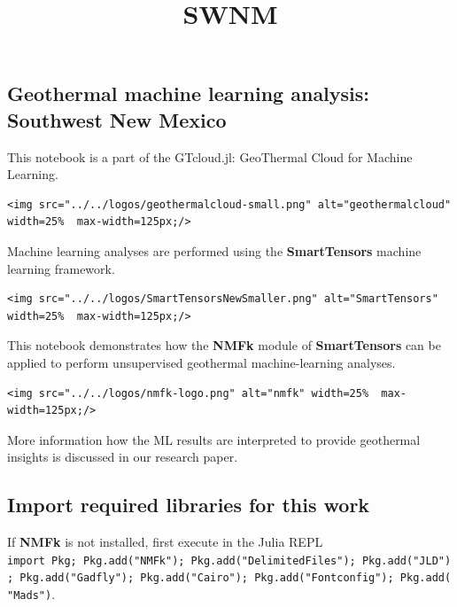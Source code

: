 \documentclass[11pt]{article}
\title{SWNM}
\begin{document}
    
    \maketitle
    
    

    
    \hypertarget{geothermal-machine-learning-analysis-southwest-new-mexico}{%
\subsection{Geothermal machine learning analysis: Southwest New
Mexico}\label{geothermal-machine-learning-analysis-southwest-new-mexico}}

This notebook is a part of the GTcloud.jl: GeoThermal Cloud for Machine
Learning.

\begin{verbatim}
<img src="../../logos/geothermalcloud-small.png" alt="geothermalcloud" width=25%  max-width=125px;/>
\end{verbatim}

Machine learning analyses are performed using the \textbf{SmartTensors}
machine learning framework.

\begin{verbatim}
<img src="../../logos/SmartTensorsNewSmaller.png" alt="SmartTensors" width=25%  max-width=125px;/>
\end{verbatim}

This notebook demonstrates how the \textbf{NMFk} module of
\textbf{SmartTensors} can be applied to perform unsupervised geothermal
machine-learning analyses.

\begin{verbatim}
<img src="../../logos/nmfk-logo.png" alt="nmfk" width=25%  max-width=125px;/>
\end{verbatim}

More information how the ML results are interpreted to provide
geothermal insights is discussed in our research paper.

    \hypertarget{import-required-libraries-for-this-work}{%
\subsection{Import required libraries for this
work}\label{import-required-libraries-for-this-work}}

If \textbf{NMFk} is not installed, first execute in the Julia REPL
\texttt{import\ Pkg;\ Pkg.add("NMFk");\ Pkg.add("DelimitedFiles");\ Pkg.add("JLD");\ Pkg.add("Gadfly");\ Pkg.add("Cairo");\ Pkg.add("Fontconfig");\ Pkg.add("Mads")}.
\end{document}
